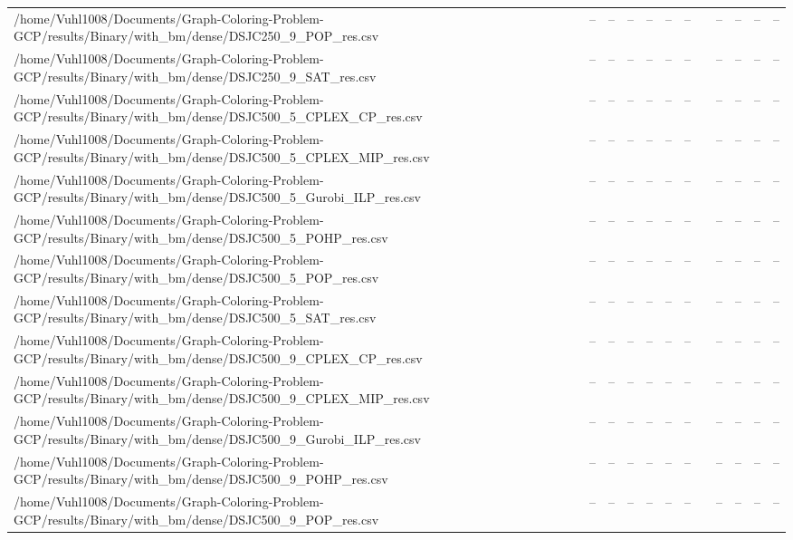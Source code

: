 \begin{table}[htbp]
\begin{tabular}{llllllllllll}
/home/Vuhl1008/Documents/Graph-Coloring-Problem-GCP/results/Binary/with\_bm/dense/DSJC250\_9\_POP\_res.csv & -- & -- & -- & -- & -- & -- & {} & -- & -- & -- & -- \\
/home/Vuhl1008/Documents/Graph-Coloring-Problem-GCP/results/Binary/with\_bm/dense/DSJC250\_9\_SAT\_res.csv & -- & -- & -- & -- & -- & -- & {} & -- & -- & -- & -- \\
/home/Vuhl1008/Documents/Graph-Coloring-Problem-GCP/results/Binary/with\_bm/dense/DSJC500\_5\_CPLEX\_CP\_res.csv & -- & -- & -- & -- & -- & -- & {} & -- & -- & -- & -- \\
/home/Vuhl1008/Documents/Graph-Coloring-Problem-GCP/results/Binary/with\_bm/dense/DSJC500\_5\_CPLEX\_MIP\_res.csv & -- & -- & -- & -- & -- & -- & {} & -- & -- & -- & -- \\
/home/Vuhl1008/Documents/Graph-Coloring-Problem-GCP/results/Binary/with\_bm/dense/DSJC500\_5\_Gurobi\_ILP\_res.csv & -- & -- & -- & -- & -- & -- & {} & -- & -- & -- & -- \\
/home/Vuhl1008/Documents/Graph-Coloring-Problem-GCP/results/Binary/with\_bm/dense/DSJC500\_5\_POHP\_res.csv & -- & -- & -- & -- & -- & -- & {} & -- & -- & -- & -- \\
/home/Vuhl1008/Documents/Graph-Coloring-Problem-GCP/results/Binary/with\_bm/dense/DSJC500\_5\_POP\_res.csv & -- & -- & -- & -- & -- & -- & {} & -- & -- & -- & -- \\
/home/Vuhl1008/Documents/Graph-Coloring-Problem-GCP/results/Binary/with\_bm/dense/DSJC500\_5\_SAT\_res.csv & -- & -- & -- & -- & -- & -- & {} & -- & -- & -- & -- \\
/home/Vuhl1008/Documents/Graph-Coloring-Problem-GCP/results/Binary/with\_bm/dense/DSJC500\_9\_CPLEX\_CP\_res.csv & -- & -- & -- & -- & -- & -- & {} & -- & -- & -- & -- \\
/home/Vuhl1008/Documents/Graph-Coloring-Problem-GCP/results/Binary/with\_bm/dense/DSJC500\_9\_CPLEX\_MIP\_res.csv & -- & -- & -- & -- & -- & -- & {} & -- & -- & -- & -- \\
/home/Vuhl1008/Documents/Graph-Coloring-Problem-GCP/results/Binary/with\_bm/dense/DSJC500\_9\_Gurobi\_ILP\_res.csv & -- & -- & -- & -- & -- & -- & {} & -- & -- & -- & -- \\
/home/Vuhl1008/Documents/Graph-Coloring-Problem-GCP/results/Binary/with\_bm/dense/DSJC500\_9\_POHP\_res.csv & -- & -- & -- & -- & -- & -- & {} & -- & -- & -- & -- \\
/home/Vuhl1008/Documents/Graph-Coloring-Problem-GCP/results/Binary/with\_bm/dense/DSJC500\_9\_POP\_res.csv & -- & -- & -- & -- & -- & -- & {} & -- & -- & -- & -- \\

\end{tabular}
\end{table}
